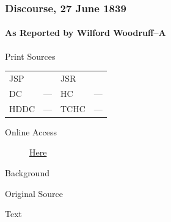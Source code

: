 		\subsubsection{Discourse, 27 June 1839}
			\label{EMS-1839-JS-27-JUN-1839}
			
			\paragraph{As Reported by Wilford Woodruff--A}
				\label{EMS-1839-JS-27-JUN-1839-WW-A}
				
				\begin{description}
					\item[Print Sources]
				\end{description}

					\begin{tabular}{p{0.5in}p{1in}p{0.5in}p{1in}}
					JSP	 	& 			& JSR 		&  \\
					DC	 	& ---		& HC 		& --- \\
					HDDC 	& ---		& TCHC 		& --- \\
					\end{tabular}
				
				\begin{description}
					\item[Online Access] \href{https://www.josephsmithpapers.org/paper-summary/discourse-27-june-1839-as-reported-by-wilford-woodruff-a/1}{Here}
				\end{description}
				
				\begin{description}
					\item[Background]
				\end{description}
				
				
				\begin{description}
					\item[Original Source]
				\end{description}
				
				
				\begin{description}
					\item[Text]
				\end{description}
				

